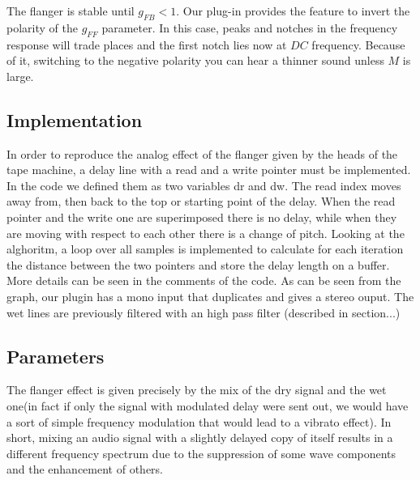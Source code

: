 The flanger is stable until $g_{FB} < 1$. 
Our plug-in provides the feature to invert the polarity of the $g_{FF}$ parameter. In this case, peaks and notches in the frequency response will trade places and the first notch lies now at $DC$ frequency. Because of it, switching to the negative polarity you can hear a thinner sound unless $M$ is large.

\subsection{Implementation}\label{sec:implementation}

In order to reproduce the analog effect of the flanger given by the heads of the tape machine, a delay line with a read and a write pointer must be implemented. In the code we defined them as two variables dr and dw. The read index moves away from, then back to the top or starting point of the delay. When the read pointer and the write one are superimposed there is no delay, while when they are moving with respect to each other there is a change of pitch. Looking at the alghoritm, a loop over all samples is implemented to calculate for each iteration the distance between the two pointers and store the delay length on a buffer. More details can be seen in the comments of the code.
As can be seen from the graph, our plugin has a mono input that duplicates and gives a stereo ouput. The wet lines are previously filtered with an high pass filter (described in section...) 

\subsection{Parameters}\label{sec:Parameters}

The flanger effect is given precisely by the mix of the dry signal and the wet one(in fact if only the signal with modulated delay were sent out, we would have a sort of simple frequency modulation that would lead to a vibrato effect). In short, mixing an audio signal with a slightly delayed copy of itself results in a different frequency spectrum due to the suppression of some wave components and the enhancement of others.

